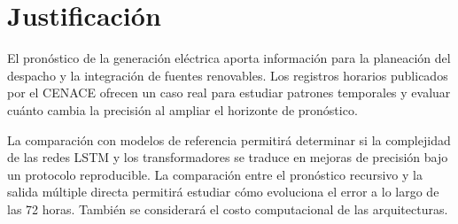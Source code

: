 \section{Justificación}

El pronóstico de la generación eléctrica aporta información para la planeación del despacho y la integración de fuentes renovables. Los registros horarios publicados por el CENACE ofrecen un caso real para estudiar patrones temporales y evaluar cuánto cambia la precisión al ampliar el horizonte de pronóstico.

La comparación con modelos de referencia permitirá determinar si la complejidad de las redes LSTM y los transformadores se traduce en mejoras de precisión bajo un protocolo reproducible. La comparación entre el pronóstico recursivo y la salida múltiple directa permitirá estudiar cómo evoluciona el error a lo largo de las 72 horas. También se considerará el costo computacional de las arquitecturas.

